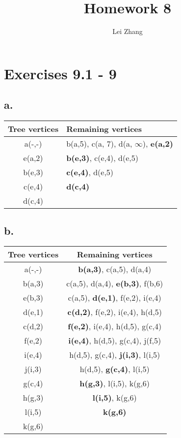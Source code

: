 \documentclass{article}
\title{Homework 8}
\author{Lei Zhang}
\begin{document}
\maketitle

\section{Exercises 9.1 - 9}

\subsection*{a.}

\begin{center}
  \begin{tabular}{c l}
    \hline
    Tree vertices & Remaining vertices \\
    \hline
    a(-,-) & b(a,5), c(a, 7), d(a, $\infty$), \textbf{e(a,2)} \\
    e(a,2) & \textbf{b(e,3)}, c(e,4), d(e,5) \\
    b(e,3) & \textbf{c(e,4)}, d(e,5) \\
    c(e,4) & \textbf{d(c,4)} \\
    d(c,4) & \\
    \hline 
  \end{tabular}
\end{center}

\subsection*{b.}

\begin{center}
  \begin{tabular}{ c c}
    \hline
    Tree vertices & Remaining vertices \\
    \hline
    a(-,-) & \textbf{b(a,3)}, c(a,5), d(a,4)\\
    b(a,3) & c(a,5), d(a,4), \textbf{e(b,3)}, f(b,6)\\
    e(b,3) & c(a,5), \textbf{d(e,1)}, f(e,2), i(e,4)\\
    d(e,1) & \textbf{c(d,2)}, f(e,2), i(e,4), h(d,5)\\
    c(d,2) & \textbf{f(e,2)}, i(e,4), h(d,5), g(c,4)\\
    f(e,2) & \textbf{i(e,4)}, h(d,5), g(c,4), j(f,5)\\
    i(e,4) & h(d,5), g(c,4), \textbf{j(i,3)}, l(i,5)\\
    j(i,3) & h(d,5), \textbf{g(c,4)}, l(i,5)\\
    g(c,4) & \textbf{h(g,3)}, l(i,5), k(g,6)\\
    h(g,3) & \textbf{l(i,5)}, k(g,6)\\
    l(i,5) & \textbf{k(g,6)}\\
    k(g,6) &\\
    \hline 
  \end{tabular}
\end{center}
\end{document}
